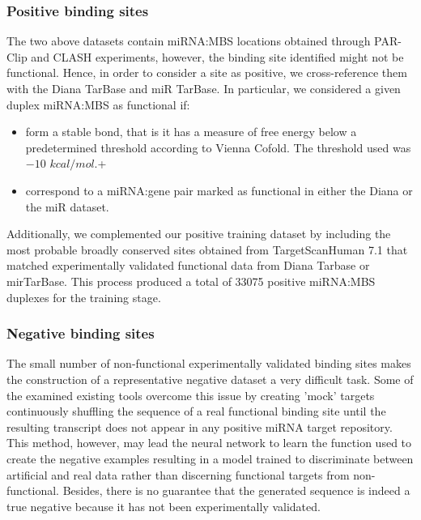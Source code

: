 \subsubsection{Positive binding sites}
The two above datasets contain miRNA:MBS locations obtained through PAR-Clip \cite{parclip}  and CLASH \cite{clash}  experiments, however, the binding site identified might not be functional. Hence, in order to consider a site as positive, we cross-reference them with the Diana TarBase and miR TarBase. In particular, we considered a given duplex miRNA:MBS as functional if:
\begin{itemize}
	\item form a stable bond, that is it has a measure of free energy below a predetermined threshold according to Vienna Cofold. The threshold used was $-10$ $kcal/mol$.+
	\item correspond to a miRNA:gene pair marked as functional in either the Diana or the miR dataset.
\end{itemize} 
Additionally, we complemented our positive training dataset by including the most probable broadly conserved sites obtained from TargetScanHuman 7.1 \cite{targetscan} that matched experimentally validated functional data from Diana Tarbase or mirTarBase.
This process produced a total of 33075 positive miRNA:MBS duplexes for the training stage.

\subsubsection{Negative binding sites}
The small number of non-functional experimentally validated binding sites makes 
the construction of a representative negative dataset a very difficult task. Some of the examined existing tools overcome this issue by creating 'mock' targets \cite{mirmark} continuously shuffling the sequence of a real functional binding site until the resulting transcript does not appear in any positive miRNA target repository. This method, however, may lead the neural network to learn the function used to create the negative examples resulting in a model trained to discriminate between artificial and real data rather than discerning functional targets from non-functional. Besides, there is no guarantee that the generated sequence is indeed a true negative because it has not been experimentally validated.

